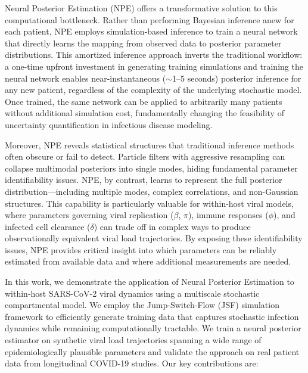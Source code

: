 \documentclass{article}
\begin{document}
Neural Posterior Estimation (NPE) offers a transformative solution to this computational bottleneck. Rather than performing Bayesian inference anew for each patient, NPE employs simulation-based inference to train a neural network that directly learns the mapping from observed data to posterior parameter distributions. This amortized inference approach inverts the traditional workflow: a one-time upfront investment in generating training simulations and training the neural network enables near-instantaneous ($\sim$1--5 seconds) posterior inference for any new patient, regardless of the complexity of the underlying stochastic model. Once trained, the same network can be applied to arbitrarily many patients without additional simulation cost, fundamentally changing the feasibility of uncertainty quantification in infectious disease modeling.

Moreover, NPE reveals statistical structures that traditional inference methods often obscure or fail to detect. Particle filters with aggressive resampling can collapse multimodal posteriors into single modes, hiding fundamental parameter identifiability issues. NPE, by contrast, learns to represent the full posterior distribution—including multiple modes, complex correlations, and non-Gaussian structures. This capability is particularly valuable for within-host viral models, where parameters governing viral replication ($\beta$, $\pi$), immune responses ($\phi$), and infected cell clearance ($\delta$) can trade off in complex ways to produce observationally equivalent viral load trajectories. By exposing these identifiability issues, NPE provides critical insight into which parameters can be reliably estimated from available data and where additional measurements are needed.

In this work, we demonstrate the application of Neural Posterior Estimation to within-host SARS-CoV-2 viral dynamics using a multiscale stochastic compartmental model. We employ the Jump-Switch-Flow (JSF) simulation framework to efficiently generate training data that captures stochastic infection dynamics while remaining computationally tractable. We train a neural posterior estimator on synthetic viral load trajectories spanning a wide range of epidemiologically plausible parameters and validate the approach on real patient data from longitudinal COVID-19 studies. Our key contributions are:
\end{document}
